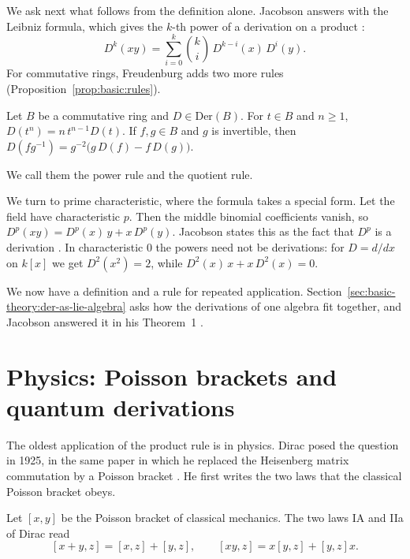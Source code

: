We ask next what follows from the definition alone. Jacobson answers with the
Leibniz formula, which gives the $k$-th power of a derivation on a product
\cite[formula~(7), p.~207]{Jacobson1937}:
\[
D^k(xy) = \sum_{i=0}^{k} \binom{k}{i}\, D^{k-i}(x)\, D^{i}(y).
\]
For commutative rings, Freudenburg adds two more rules (Proposition~\ref{prop:basic:rules}).

\begin{proposition}\label{prop:basic:rules}
Let $B$ be a commutative ring and $D \in \mathrm{Der}(B)$. For $t \in B$ and $n \ge 1$,
$D(t^n) = n\,t^{n-1}D(t)$. If $f, g \in B$ and $g$ is invertible, then
$D(f g^{-1}) = g^{-2}\bigl(g\,D(f) - f\,D(g)\bigr)$.
\end{proposition}

We call them the power rule and the quotient rule.

We turn to prime characteristic, where the formula takes a special form. Let the field have characteristic $p$. Then the middle binomial coefficients vanish, so
$D^p(xy) = D^p(x)\,y + x\,D^p(y)$. Jacobson states this as the fact that $D^p$
is a derivation \cite[formula~(8), p.~207]{Jacobson1937}. In characteristic $0$ the powers need not be derivations: for $D = d/dx$ on $k[x]$ we get $D^2(x^2) = 2$, while $D^2(x)\,x + x\,D^2(x) = 0$.

We now have a definition and a rule for repeated application.
Section~\ref{sec:basic-theory:der-as-lie-algebra} asks how the derivations of
one algebra fit together, and Jacobson answered it in his Theorem~1
\cite[p.~207]{Jacobson1937}.

\section{Physics: Poisson brackets and quantum derivations}\label{sec:basic-theory:physics}

The oldest application of the product rule is in physics. %
Dirac posed the
question in 1925, in the same paper in which he replaced the
Heisenberg matrix commutation by a Poisson bracket
\cite{Dirac1925}. He first writes the two laws that the classical Poisson
bracket obeys.

\begin{definition}\label{def:basic:dirac-poisson}
Let $[x,y]$ be the Poisson bracket of classical mechanics. The two laws
IA and IIa of Dirac read
\[
[x+y,z]=[x,z]+[y,z],\qquad [xy,z]=x[y,z]+[y,z]x .
\]
\end{definition}

